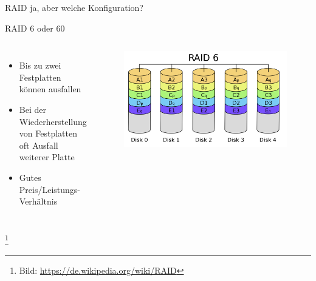 \documentclass[10pt]{beamer}
\newcommand\blfootnote[1]{%
	\begingroup
	\renewcommand\thefootnote{}\footnote{#1}%
	\addtocounter{footnote}{-1}%
	\endgroup
}
\begin{document}
%
%
\begin{frame}[fragile]{RAID ja, aber welche Konfiguration?}
\begin{alertblock}{RAID 6 oder 60}
\end{alertblock}
\begin{columns}[T,c,onlytextwidth]
	\begin{itemize}
		\item Bis zu zwei Festplatten können ausfallen
		\item Bei der Wiederherstellung von Festplatten oft Ausfall weiterer Platte
		\item Gutes Preis/Leistungs-Verhältnis
	\end{itemize}
	\begin{figure}
		\includegraphics[width=1\textwidth]{images/RAID_6}
	\end{figure}
\end{columns}
	\blfootnote{Bild: \href{https://de.wikipedia.org/wiki/RAID}{https://de.wikipedia.org/wiki/RAID}}
\end{frame}
\end{document}
